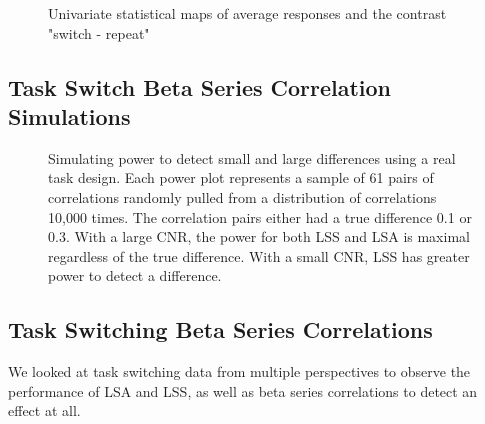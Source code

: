 \documentclass[10pt,letterpaper]{article}
\begin{document}
\begin{figure}[H]
  \ContinuedFloat
  \centering
  \subfloat{
    
  }
  \label{fig:statmaps}
\end{figure}

\begin{figure}[H]
  \ContinuedFloat
  \centering
  \subfloat{
    
  }
  \label{fig:statmaps}
\end{figure}

\begin{figure}[H]
  \ContinuedFloat
  \centering
  \subfloat{
    
  }
  \caption{Univariate statistical maps of average responses and the contrast "switch - repeat"}
  \label{fig:statmaps}
\end{figure}

\subsection*{Task Switch Beta Series Correlation Simulations}

\begin{figure}[H]
  \centering
  \subfloat{
    
  }
  \label{fig:taskpwr}
\end{figure}

\begin{figure}[H]
  \centering
  \ContinuedFloat
  \subfloat{
    
  }
  \caption{
    Simulating power to detect small and large differences using
    a real task design.
    Each power plot represents a sample of 61 pairs of correlations
    randomly pulled from a distribution of correlations 10,000 times.
    The correlation pairs either had a true difference 0.1 or 0.3.
    With a large CNR, the power for both LSS and LSA
    is maximal regardless of the true difference.
    With a small CNR, LSS has greater power to detect a difference.
    }
  \label{fig:taskpwr}
\end{figure}

\subsection*{Task Switching Beta Series Correlations}
We looked at task switching data from multiple perspectives to observe the performance of LSA and LSS,
as well as beta series correlations to detect an effect at all.
\end{document}
